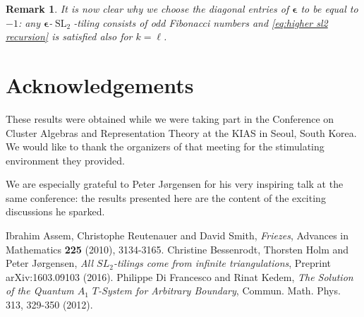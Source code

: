 \documentclass[12pt]{amsart}
\newtheorem{remark}[theorem]{Remark}
\newcommand{\bepsilon}{\boldsymbol{\epsilon}}
\newcommand{\SL}{\operatorname{SL}}
\begin{document}
  \begin{remark}
    It is now clear why we choose the diagonal entries of $\bepsilon$ to be equal to $-1$: any $\bepsilon$-$\SL_2$-tiling consists of odd Fibonacci numbers and \eqref{eq:higher sl2 recursion} is satisfied also for $k=\ell$.
  \end{remark}

\section*{Acknowledgements}
  These results were obtained while we were taking part in the Conference on Cluster Algebras and Representation Theory at the KIAS in Seoul, South Korea.
  We would like to thank the organizers of that meeting for the stimulating environment they provided.

  We are especially grateful to Peter J\o rgensen for his very inspiring talk at the same conference: the results presented here are the content of the exciting discussions he sparked.

\begin{thebibliography}{99}
   Ibrahim Assem, Christophe Reutenauer and David Smith, \emph{Friezes}, Advances in Mathematics {\bf 225} (2010), 3134-3165.
   Christine Bessenrodt, Thorsten Holm and Peter J{\o}rgensen, \emph{All $SL_2$-tilings come from infinite triangulations}, Preprint arXiv:1603.09103 (2016).
   Philippe Di Francesco and Rinat Kedem, \emph{The Solution of the Quantum $A_1$ $T$-System for Arbitrary Boundary}, Commun. Math. Phys. 313, 329-350 (2012).
\end{thebibliography}
\end{document}
